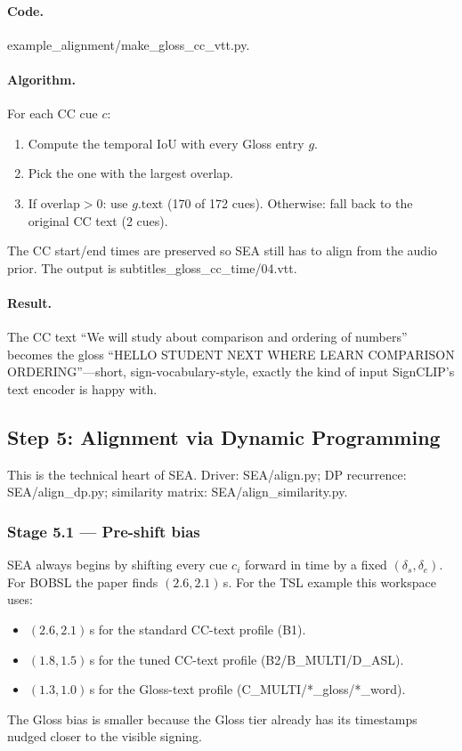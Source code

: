 \documentclass[11pt,a4paper]{article}
\def\texttt#1{#1}%
\def\emph#1{#1}%
\begin{document}
\paragraph{Code.} \texttt{example\_alignment/make\_gloss\_cc\_vtt.py}.

\paragraph{Algorithm.} For each CC cue $c$:
\begin{enumerate}[leftmargin=1.5em]
  \item Compute the temporal IoU with every \texttt{Gloss} entry $g$.
  \item Pick the one with the largest overlap.
  \item If overlap${}>0$: use $g.\text{text}$ (170 of 172 cues).
        Otherwise: fall back to the original CC text (2 cues).
\end{enumerate}
The CC start/end times are preserved so SEA still has to align from the
audio prior. The output is \texttt{subtitles\_gloss\_cc\_time/04.vtt}.

\paragraph{Result.} The CC text \emph{``We will study about comparison and
ordering of numbers''} becomes the gloss \emph{``HELLO STUDENT NEXT WHERE
LEARN COMPARISON ORDERING''}---short, sign-vocabulary-style, exactly the kind
of input SignCLIP's text encoder is happy with.


\subsection{Step 5: Alignment via Dynamic Programming}
\label{sec:dp}

This is the technical heart of SEA. Driver:
\texttt{SEA/align.py}; DP recurrence: \texttt{SEA/align\_dp.py}; similarity
matrix: \texttt{SEA/align\_similarity.py}.

\subsubsection{Stage 5.1 --- Pre-shift bias}
SEA always begins by shifting every cue $c_i$ forward in time by a fixed
$(\delta_s, \delta_e)$. For BOBSL the paper finds $(2.6, 2.1)$\,s. For the
TSL example this workspace uses:
\begin{itemize}[leftmargin=1.5em]
  \item $(2.6, 2.1)$\,s for the standard CC-text profile (B1).
  \item $(1.8, 1.5)$\,s for the tuned CC-text profile (B2/B\_MULTI/D\_ASL).
  \item $(1.3, 1.0)$\,s for the Gloss-text profile (C\_MULTI/*\_gloss/*\_word).
\end{itemize}
The Gloss bias is smaller because the Gloss tier already has its timestamps
nudged closer to the visible signing.
\end{document}
